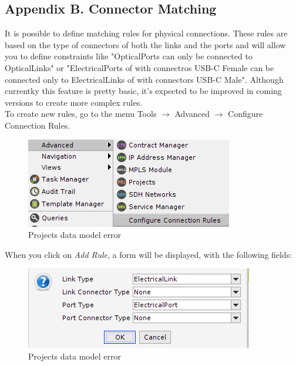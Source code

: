 \documentclass[a4paper]{article}
\begin{document}
\begin{appendices}
			\section{Appendix B. Connector Matching} \label{app:AppendixB}
			It is possible to define matching rules for physical connections. These rules are based on the type of connectors of both the links and the ports and will allow you to define constraints like "OpticalPorts can only be connected to OpticalLinks" or "ElectricalPorts of with connectros USB-C Female can be connected only to ElectricalLinks of with connectors USB-C Male". Although currentky this feature is pretty basic, it's expected to be improved in coming versions to create more complex rules.\\
			To create new rules, go to the menu Tools $\rightarrow$ Advanced $\rightarrow$ Configure Connection Rules.\\
			\begin{figure}[h!]
				\centering
				\includegraphics[width=0.6\linewidth]{img/appendix_b_connector_matching_menu.png}
				\caption{Projects data model error}
				\label{fig:connector_rules_menu}
			\end{figure}
			
			When you click on \textit{Add Rule}, a form will be displayed, with the following fields:
			\begin{figure}[h!]
				\centering
				\includegraphics[width=0.6\linewidth]{img/appendix_b_connector_matching_configuration.png}
				\caption{Projects data model error}
				\label{fig:connector_rules_config}
			\end{figure}
			

\end{appendices}
\end{document}
